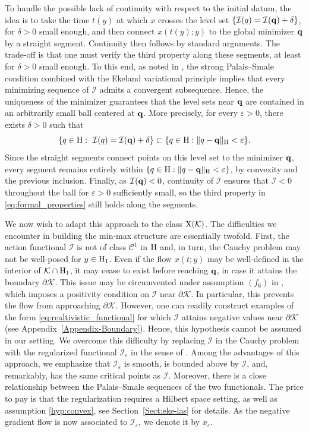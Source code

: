 \documentclass{article}
\newcommand{\boC}{\mathcal{C}}
\newcommand{\boK}{\mathcal{K}}
\newcommand{\boI}{\mathcal{I}}
\newcommand{\Hilb}{{\textnormal H}}
\newcommand{\minq}{{\bf q}}
\newcommand{\X}{{\textnormal X}}
\theoremstyle{definition}
\begin{document}
To handle the possible lack of continuity with respect to the initial datum, the idea is to take the time $t(y)$ at which $x$ crosses the level set $\{\boI(q)=\boI(\minq)+\delta\}$, for $\delta>0$ small enough, and then connect $x(t(y);y)$ to the global minimizer $\minq$ by a straight segment. Continuity then follows by standard arguments. The trade-off is that one must verify the third property along these segments, at least for $\delta>0$ small enough. To this end, as noted in \cite[Proposition 2]{Bre-Nir}, the strong Palais--Smale condition combined with the Ekeland variational principle implies that every minimizing sequence of $\boI$ admits a convergent subsequence. Hence, the uniqueness of the minimizer guarantees that the level sets near $\minq$ are contained in an arbitrarily small ball centered at $\minq$. More precisely, for every $\varepsilon>0$, there exists $\delta>0$ such that
\begin{equation}
    \{q\in\Hilb:\ \boI(q)=\boI(\minq)+\delta\}\subset\{q\in\Hilb: \|q-\minq\|_\Hilb<\varepsilon\}.
\end{equation}
Since the straight segments connect points on this level set to the minimizer $\minq$, every segment remains entirely within $\{q\in\Hilb:\|q-\minq\|_\Hilb<\varepsilon\}$, by convexity and the previous inclusion. Finally, as $\boI(\minq)<0$, continuity of $\boI$ ensures that $\boI<0$ throughout the ball for $\varepsilon>0$ sufficiently small, so the third property in \eqref{eq:formal_properties} still holds along the segments.


We now wish to adapt this approach to the class $\X(\boK)$. The difficulties we encounter in building the min-max structure are essentially twofold. First, the action functional $\boI$ is not of class $\boC^1$ in $\Hilb$ and, in turn, the Cauchy problem may not be well-posed for $y\in\Hilb_1$. Even if the flow $x(t;y)$ may be well-defined in the interior of $\boK\cap\Hilb_1$, it may cease to exist before reaching $\minq$, in case it attains the boundary $\partial\boK$. This issue may be circumvented under assumption $(f_6)$ in \cite{LMM}, which imposes a positivity condition on $\boI$ near $\partial\boK$. In particular, this prevents the flow from approaching $\partial\boK$. 
 However, one can readily construct examples of the form \eqref{eq:realtivistic_functional} for which $\boI$ attains negative values near $\partial\boK$ (see Appendix~\ref{Appendix-Boundary}). Hence, this hypothesis cannot be assumed in our setting. We overcome this difficulty by replacing $\boI$ in the Cauchy problem with the regularized functional $\boI_\varepsilon$ in the sense of \cite{Eke-Las}.  Among the advantages of this approach, we emphasize that $\boI_\varepsilon$ is smooth, is bounded above by $\boI$, and, remarkably, has the same critical points as $\boI$. Moreover, there is a close relationship between the Palais--Smale sequences of the two functionals. The price to pay is that the regularization requires a Hilbert space setting, as well as assumption \eqref{hyp:convex}, see Section~\ref{Sect:eke-las} for details. As the negative gradient flow is now associated to $\boI_\varepsilon$, we denote it by $x_\varepsilon$.
\end{document}

